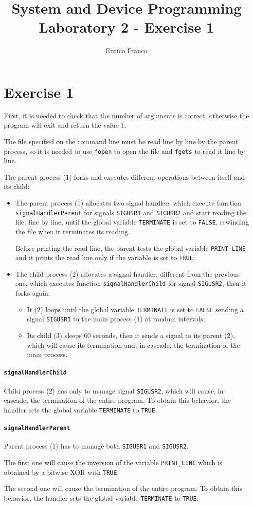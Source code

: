 \documentclass{report}
\author{Enrico Franco}
\title{System and Device Programming \\
	Laboratory 2 - Exercise 1}
\begin{document}
\section*{Exercise 1}
First, it is needed to check that the number of arguments is correct, otherwise the program will exit and return the value 1.

The file specified on the command line must be read line by line by the parent process, so  it is needed to use \texttt{fopen} to open the file and \texttt{fgets} to read it line by line.

The parent process (1) forks and executes different operations between itself and its child:
\begin{itemize}
\item The parent process (1) allocates two signal handlers which execute function \texttt{signalHandlerParent} for signals \texttt{SIGUSR1} and \texttt{SIGUSR2} and start reading the file, line by line, until the global variable \texttt{TERMINATE} is set to \texttt{FALSE}, rewinding the file when it terminates its reading.

Before printing the read line, the parent tests the global variable \texttt{PRINT\_LINE} and it prints the read line only if the variable is set to \texttt{TRUE};
\item The child process (2) allocates a signal handler, different from the previous one, which executes function \texttt{signalHandlerChild} for signal \texttt{SIGUSR2}, then it forks again:
\begin{itemize}
\item It (2) loops until the global variable \texttt{TERMINATE} is set to \texttt{FALSE} sending a signal \texttt{SIGUSR1} to the main process (1) at random intervals;
\item Its child (3) sleeps 60 seconds, then it sends a signal to its parent (2), which will cause its termination and, in cascade, the termination of the main process.
\end{itemize}
\end{itemize}

\paragraph{\texttt{signalHandlerChild}}
Child process (2) has only to manage signal \texttt{SIGUSR2}, which will cause, in cascade, the termination of the entire program. To obtain this behavior, the handler sets the global variable \texttt{TERMINATE} to \texttt{TRUE}.

\paragraph{\texttt{signalHandlerParent}}
Parent process (1) has to manage both \texttt{SIGUSR1} and \texttt{SIGUSR2}.

The first one will cause the inversion of the variable \texttt{PRINT\_LINE} which is obtained by a bitwise XOR with \texttt{TRUE}.

The second one will cause the termination of the entire program. To obtain this behavior, the handler sets the global variable \texttt{TERMINATE} to \texttt{TRUE}.
\end{document}
